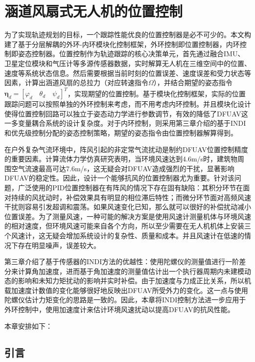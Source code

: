 \chapter{涵道风扇式无人机的位置控制}

为了实现轨迹规划的目标，一个跟踪性能优良的位置控制器是必不可少的。本文构建了基于分层解耦的外环-内环模块化控制框架，外环控制即位置控制器，内环控制即姿态控制器。位置控制作为轨迹跟踪的核心决策单元，首先通过融合IMU、卫星定位模块和气压计等多源传感器数据，实时解算无人机在三维空间中的位置、速度等系统状态信息。然后需要根据当前时刻的位置误差、速度误差和受力状态等因素，计算出涵道风扇的总拉力（对应转速指令$\Omega$），并结合期望的姿态指令$\boldsymbol{\eta}_d=[\varphi_d\quad \theta_d\quad \psi_d]^T$，实现期望的位置控制。基于模块化控制框架，实际的位置跟踪问题可以按照单独的外环控制来考虑，而不用考虑内环控制。并且模块化设计使得位置控制回路可以独立于姿态动力学进行参数调节，有效的降低了DFUAV这一多变量耦合系统的设计复杂度。对于内环控制，则采用第三章介绍的基于INDI和优先级控制分配的姿态控制策略，期望的姿态指令由位置控制器解算得到。

在户外复杂气流环境中，阵风引起的非定常气流扰动是制约DFUAV位置控制精度的重要因素。计算流体力学仿真研究表明，当环境风速达到4.6m/s时，建筑物周围空气流速最高可达7.6m/s，这无疑会对DFUAV造成强烈的干扰，显著影响DFUAV的稳定性。因此，设计一个能够抗风的位置控制器尤为重要。针对该问题，广泛使用的PID位置控制器在有阵风的情况下存在固有缺陷：其积分环节在面对持续的风扰动时，补偿效果具有明显的相位滞后特性；而微分环节面对高频风速干扰则容易引发超调和震荡。如果风速变化已知，那么就可以很好的补偿扰动减小位置误差。为了测量风速，一种可能的解决方案是使用风速计测量机体与环境风速的相对速度，但环境风速可能来自各个方向，所以至少需要在无人机机体上安装三个风速计，这无疑会增加系统设计的复杂性、质量和成本。并且风速计在低速的情况下存在明显噪声，误差较大。

第三章介绍了基于传感器的INDI方法的优越性：使用陀螺仪的测量值进行一阶差分来计算角加速度，进而基于角加速度的测量值估计出一个执行器周期内未建模动态的影响和未知力矩扰动的影响并实时补偿。由于加速度与力成正比关系，所以机载加速度计数值的变化能够很好地反映出DFUAV所受外力的变化。这一点与使用陀螺仪估计力矩变化的思路是一致的。因此，本章将INDI控制方法进一步应用于外环控制中，使用加速度计来估计环境风速扰动以提高DFUAV的抗风性能。

本章安排如下：
\section{引言}
































